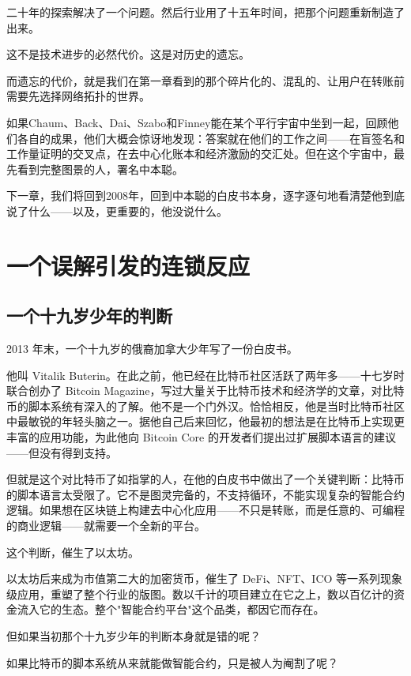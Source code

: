\documentclass[a4paper,12pt,openany]{ctexbook}
\begin{document}
二十年的探索解决了一个问题。然后行业用了十五年时间，把那个问题重新制造了出来。

这不是技术进步的必然代价。这是对历史的遗忘。

而遗忘的代价，就是我们在第一章看到的那个碎片化的、混乱的、让用户在转账前需要先选择网络拓扑的世界。

如果Chaum、Back、Dai、Szabo和Finney能在某个平行宇宙中坐到一起，回顾他们各自的成果，他们大概会惊讶地发现：答案就在他们的工作之间——在盲签名和工作量证明的交叉点，在去中心化账本和经济激励的交汇处。但在这个宇宙中，最先看到完整图景的人，署名中本聪。

下一章，我们将回到2008年，回到中本聪的白皮书本身，逐字逐句地看清楚他到底说了什么——以及，更重要的，他没说什么。



\chapter{一个误解引发的连锁反应}



\section*{一个十九岁少年的判断}


2013 年末，一个十九岁的俄裔加拿大少年写了一份白皮书。

他叫 Vitalik Buterin。在此之前，他已经在比特币社区活跃了两年多——十七岁时联合创办了 Bitcoin Magazine，写过大量关于比特币技术和经济学的文章，对比特币的脚本系统有深入的了解。他不是一个门外汉。恰恰相反，他是当时比特币社区中最敏锐的年轻头脑之一。据他自己后来回忆，他最初的想法是在比特币上实现更丰富的应用功能，为此他向 Bitcoin Core 的开发者们提出过扩展脚本语言的建议——但没有得到支持。

但就是这个对比特币了如指掌的人，在他的白皮书中做出了一个关键判断：比特币的脚本语言太受限了。它不是图灵完备的，不支持循环，不能实现复杂的智能合约逻辑。如果想在区块链上构建去中心化应用——不只是转账，而是任意的、可编程的商业逻辑——就需要一个全新的平台。

这个判断，催生了以太坊。

以太坊后来成为市值第二大的加密货币，催生了 DeFi、NFT、ICO 等一系列现象级应用，重塑了整个行业的版图。数以千计的项目建立在它之上，数以百亿计的资金流入它的生态。整个"智能合约平台"这个品类，都因它而存在。

但如果当初那个十九岁少年的判断本身就是错的呢？

如果比特币的脚本系统从来就能做智能合约，只是被人为阉割了呢？
\end{document}
